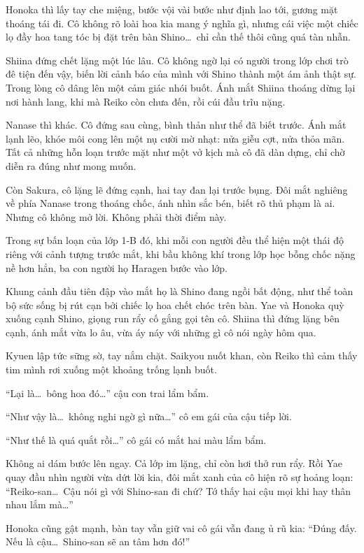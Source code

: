 \documentclass[../main.tex]{subfiles}
\begin{document}
Honoka thì lấy tay che miệng, bước vội vài bước như định lao tới, gương mặt thoáng tái đi. Cô không rõ loài hoa kia mang ý nghĩa gì, nhưng cái việc một chiếc lọ đầy hoa tang tóc bị đặt trên bàn Shino\dots\ chỉ cần thế thôi cũng quá tàn nhẫn.

Shiina đứng chết lặng một lúc lâu. Cô không ngờ lại có người trong lớp chơi trò đê tiện đến vậy, biến lời cảnh báo của mình với Shino thành một ám ảnh thật sự. Trong lòng cô dâng lên một cảm giác nhói buốt. Ánh mắt Shiina thoáng dừng lại nơi hành lang, khi mà Reiko còn chưa đến, rồi cúi đầu trĩu nặng.

Nanase thì khác. Cô đứng sau cùng, bình thản như thể đã biết trước. Ánh mắt lạnh lẽo, khóe môi cong lên một nụ cười mờ nhạt: nửa giễu cợt, nửa thỏa mãn. Tất cả những hỗn loạn trước mặt như một vở kịch mà cô đã dàn dựng, chỉ chờ diễn ra đúng như mong muốn.

Còn Sakura, cô lặng lẽ đứng cạnh, hai tay đan lại trước bụng. Đôi mắt nghiêng về phía Nanase trong thoáng chốc, ánh nhìn sắc bén, biết rõ thủ phạm là ai. Nhưng cô không mở lời. Không phải thời điểm này.

Trong sự bấn loạn của lớp 1-B đó, khi mỗi con người đều thể hiện một thái độ riêng với cảnh tượng trước mắt, khi bầu không khí trong lớp học bỗng chốc nặng nề hơn hẳn, ba con người họ Haragen bước vào lớp.

Khung cảnh đầu tiên đập vào mắt họ là Shino đang ngồi bất động, như thể toàn bộ sức sống bị rút cạn bởi chiếc lọ hoa chết chóc trên bàn. Yae và Honoka quỳ xuống cạnh Shino, giọng run rẩy cố gắng gọi tên cô. Shiina thì đứng lặng bên cạnh, ánh mắt vừa lo âu, vừa áy náy với những gì cô nói ngày hôm qua.

Kyuen lập tức sững sờ, tay nắm chặt. Saikyou nuốt khan, còn Reiko thì cảm thấy tim mình rơi xuống một khoảng trống lạnh buốt.

``Lại là\dots\ bông hoa đó\dots'' cậu con trai lẩm bẩm.

``Như vậy là\dots\ không nghi ngờ gì nữa\dots'' cô em gái của cậu tiếp lời.

``Như thế là quá quắt rồi\dots'' cô gái có mắt hai màu lẩm bẩm.

Không ai dám bước lên ngay. Cả lớp im lặng, chỉ còn hơi thở run rẩy. Rồi Yae quay đầu nhìn người vừa dứt lời kia, đôi mắt xanh của cô hiện rõ sự hoảng loạn: ``Reiko-san\dots\ Cậu nói gì với Shino-san đi chứ? Tớ thấy hai cậu mọi khi hay thân nhau lắm mà\dots''

Honoka cũng gật mạnh, bàn tay vẫn giữ vai cô gái vẫn đang ủ rũ kia: ``Đúng đấy. Nếu là cậu\dots\ Shino-san sẽ an tâm hơn đó!''
\end{document}
